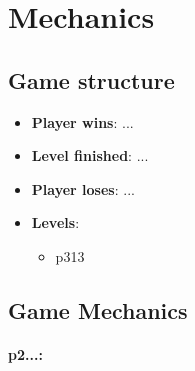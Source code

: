 %
%
%

\section{\projectname \space Mechanics}

\subsection{Game structure}
\begin{itemize}
\item \textbf{Player wins}: ...
\item \textbf{Level finished}: ...
\item \textbf{Player loses}: ...
\item \textbf{Levels}:
\begin{itemize}
\item \gls{p3}13
\end{itemize}

\end{itemize}


\subsection{Game Mechanics}

\paragraph{\gls{p2}...:}

